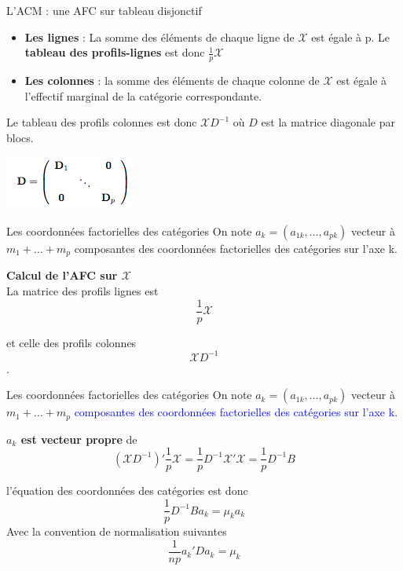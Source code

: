 \documentclass[12pt]{beamer}
\begin{document}
\begin{frame}{L'ACM : une AFC sur tableau disjonctif}

 \begin{itemize}
 \item \textbf{Les lignes }:  La somme des éléments de chaque ligne de $\mathcal{X}$
est égale à p. Le \textbf{tableau des profils-lignes} est donc $\frac{1}{p} \mathcal{X}$\\


\item \textbf{Les colonnes} : la somme des éléments de chaque colonne de $\mathcal{X}$ est égale à l'effectif marginal de la catégorie correspondante.
 \end{itemize}



Le tableau des profils colonnes est donc $\mathcal{X}D^{-1}$
où $D$ est la matrice diagonale par blocs.

\centering

\includegraphics[scale=0.8]{Disj6} 

\end{frame}



\begin{frame}{Les coordonnées factorielles des catégories}
\centering 
 On note $a_k = (a_{1k}, \ldots , a_{pk})$ vecteur à $m_1 + \ldots + m_p$ composantes des coordonnées factorielles des catégories sur l'axe k. 
 
 \textbf{Calcul de l'AFC sur $\mathcal{X}$  }\\
 
La matrice des profils lignes est $$\frac{1}{p} \mathcal{X}$$

et  celle des profils colonnes $$\mathcal{X}D^{-1}$$ . 

 
 
\end{frame}



\begin{frame}{Les coordonnées factorielles des catégories}
\centering 
 On note $a_k = (a_{1k}, \ldots , a_{pk})$ vecteur à $m_1 + \ldots + m_p$ \textcolor{blue}{composantes des coordonnées factorielles des catégories sur l'axe k}. 
 
 
\textbf{$a_k$ est vecteur propre} de $$(\mathcal{X}D^{-1})' \frac{1}{p} \mathcal{X}=\frac{1}{p}{D^{-1}} \mathcal{X}' \mathcal{X}=  \frac{1}{p}{D^{-1}} B$$ 

l’équation des coordonnées des catégories est donc 
 $$\frac{1}{p}{D^{-1}} Ba_k=\mu_k a_k  $$ 
 Avec la convention de normalisation suivantes
  $$\frac{1}{np} {a_k}'Da_k=\mu_k   $$ 

 
 
\end{frame}
\end{document}
